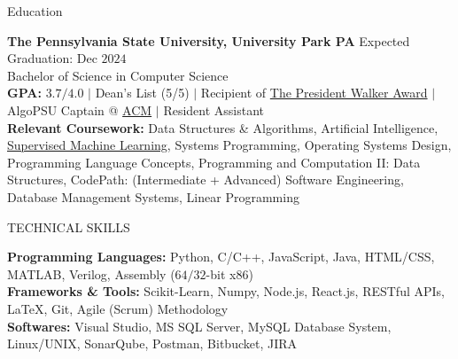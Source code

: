 \documentclass{resume} %
\begin{document}

\begin{rSection}{Education}

{\bf The Pennsylvania State University, University Park PA} \hfill {Expected Graduation: Dec $2024$}\\
{Bachelor of Science in Computer Science}\\
{\bf GPA:} $3.7/4.0$ $\vert$ Dean's List (5/5) $\vert$ Recipient of \href{https://awardsrecognition.psu.edu/student/undergraduate-scholastic-awards/}{The President Walker Award} $\vert$ AlgoPSU Captain @ \href{https://acm.psu.edu/algopsu/}{ACM} $\vert$ Resident Assistant\\
{\bf Relevant Coursework:} Data Structures \& Algorithms, Artificial Intelligence, \href{https://www.coursera.org/account/accomplishments/verify/JYX5UB5YP4YD}{Supervised Machine Learning}, Systems Programming, Operating Systems Design, Programming Language Concepts, Programming and Computation II: Data Structures, CodePath: (Intermediate + Advanced) Software Engineering, Database Management Systems, Linear Programming
\end{rSection}


\begin{rSection}{TECHNICAL SKILLS}

{\bf Programming Languages:} Python, C/C++, JavaScript, Java, HTML/CSS, MATLAB, Verilog, Assembly ($64/32$-bit x$86$)\\
{\bf Frameworks \& Tools:} Scikit-Learn, Numpy, Node.js, React.js, RESTful APIs, \LaTeX, Git, Agile (Scrum) Methodology\\
{\bf Softwares:} Visual Studio, MS SQL Server, MySQL Database System, Linux/UNIX, SonarQube, Postman, Bitbucket, JIRA

\end{rSection}
\end{document}
